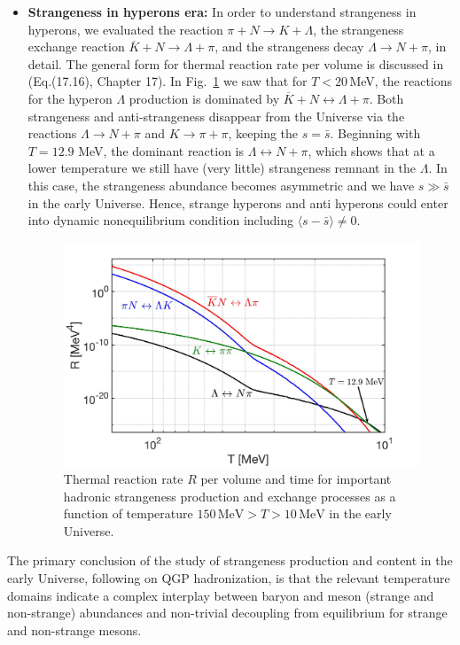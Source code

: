 \documentclass[universe,article,submit,moreauthors,pdftex,a4paper]{Definitions/mdpi}
\begin{document}
\begin{itemize}


\item \textbf{Strangeness in hyperons era:}
In order to understand strangeness in hyperons, we evaluated the reaction $\pi +N\rightarrow K+\Lambda$, the strangeness exchange reaction $\overline{K}+N\rightarrow \Lambda+\pi$, and the strangeness decay $\Lambda\rightarrow N+\pi$, in detail. The general form for thermal reaction rate per volume is discussed in~\cite{Letessier:2002ony} (Eq.(17.16), Chapter 17). In Fig.~\ref{Lambda_Rate_volume.fig} we saw that for $T<20$\,MeV, the reactions for the hyperon $\Lambda$ production is dominated by $\overline{K}+N\leftrightarrow\Lambda+\pi$. Both strangeness and anti-strangeness disappear from the Universe via the reactions $\Lambda\rightarrow N+\pi$ and $K\to\pi+\pi$, keeping the $s=\bar s$. Beginning with $T=12.9$ MeV, the dominant reaction is $\Lambda\leftrightarrow N+\pi$, which shows that at a lower temperature we still have (very little) strangeness remnant in the $\Lambda$. In this case, the strangeness abundance becomes asymmetric and we have $s\gg\bar{s}$ in the early Universe. Hence, strange hyperons and anti hyperons could enter into dynamic nonequilibrium condition including $\langle s-\bar s\rangle \ne 0$.


\begin{figure}[h]
\begin{center}
\centering
\includegraphics[width=0.8\linewidth]{./plots/NewHyperonRate_CTYang.jpg}
\caption{Thermal reaction rate $R$ per volume and time for important hadronic strangeness production and exchange processes as a function of temperature $150\,\mathrm{MeV}> T>10\,\mathrm{MeV}$ in the early Universe.}
\label{Lambda_Rate_volume.fig}
\end{center}
\end{figure}
\end{itemize}
The primary conclusion of the study of strangeness production and content in the early Universe, following on QGP hadronization, is that the relevant temperature domains indicate a complex interplay between baryon and meson (strange and non-strange) abundances and non-trivial decoupling from equilibrium for strange and non-strange mesons.
\end{document}
